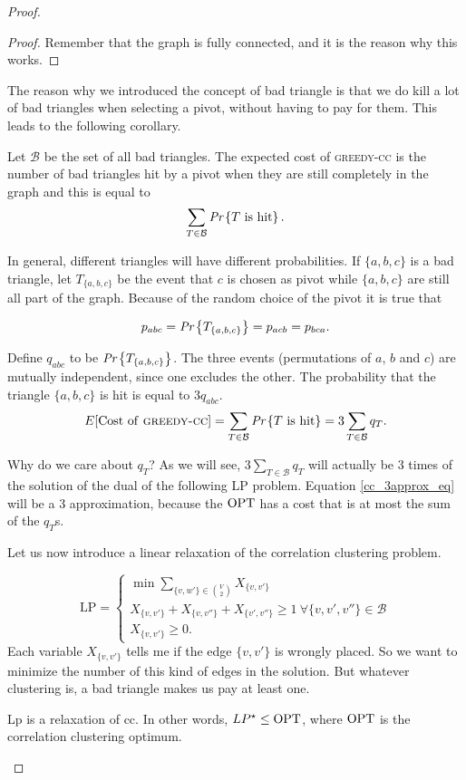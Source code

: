 \begin{proof}
\begin{proof}
		Remember that the graph is fully connected, and it is the reason why this works.
	\end{proof}
	
	The reason why we introduced the concept of bad triangle is that we do kill a lot of bad triangles  when selecting a pivot, without having to pay for them. This leads to the following corollary.
	\begin{cor}
		Let $\mathcal{B}$ be the set of all bad triangles. The expected cost of \textsc{greedy-cc} is the number of bad triangles hit by a pivot when they are still completely in the graph and this is equal to
		\begin{equation}
		\sum_{T \in \mathcal{B}}\emph{Pr}\left\{T \text{ is hit}\right\}.
		\end{equation}
	\end{cor}
	In general, different triangles will have different probabilities. If $\{a, b, c\}$ is a bad triangle, let $T_{\{a,b,c\}}$ be the event that $c$ is chosen as pivot while $\{a, b, c\}$ are still all part of the graph. Because of the random choice of the pivot it is true that
	
	\begin{equation}
	p_{abc} = \emph{Pr}\left\{T_{\{a,b,c\}}\right\} = p_{acb} = p_{bca}.
	\end{equation}
	
	Define $q_{abc}$ to be $\emph{Pr}\left\{T_{\{a,b,c\}}\right\}$. The three events (permutations of $a$, $b$ and $c$) are mutually independent, since one excludes the other. The probability that the triangle $\{a,b,c\}$ is hit is equal to $3q_{abc}$.
	\begin{equation}\label{cc_3approx_eq}
		E[\text{Cost of \textsc{greedy-cc}}] = 	\sum_{T \in \mathcal{B}}\emph{Pr}\left\{T \text{ is hit}\right\} = 3\sum_{T \in \mathcal{B}} q_T.
	\end{equation}
	
	Why do we care about $q_T$? As we will see, $3\sum_{T \in \mathcal{B}} q_T$  will actually be 3 times of the solution of the dual of the following LP problem. Equation \ref{cc_3approx_eq} will be a 3 approximation, because the $\text{OPT}$ has a cost that is at most the sum of the $q_T$s.
	
	Let us now introduce a linear relaxation of the correlation clustering problem.
	
	\begin{equation}
	\text{LP} =\begin{cases}
	\min \sum_{\{v, w'\} \in \binom{V}{2}} X_{\{v, v'\}}\\
	X_{\{v, v'\}} + X_{\{v, v''\}} + X_{\{v', v''\}} \geq 1\ \forall \{v, v', v''\} \in \mathcal{B}\\
	X_{\{v, v'\}} \geq 0.
	\end{cases}
	\end{equation}
	Each variable $X_{\{v, v'\}}$ tells me if the edge $\{v, v'\}$ is wrongly placed. So we want to minimize the number of this kind of edges in the solution. But whatever clustering is, a bad triangle makes us pay at least one.
	\begin{lem}
		Lp is a relaxation of cc. In other words, $LP^\star \leq \text{OPT}$, where $\text{OPT}$ is the correlation clustering optimum.
	\end{lem}
	

\end{proof}
